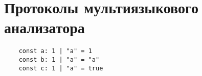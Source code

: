 \chapter{Протоколы мультиязыкового анализатора}
\label{cha:appendix1}

\begin{verbatim}
    const a: 1 | "a" = 1
    const b: 1 | "a" = "a"
    const c: 1 | "a" = true
\end{verbatim}

